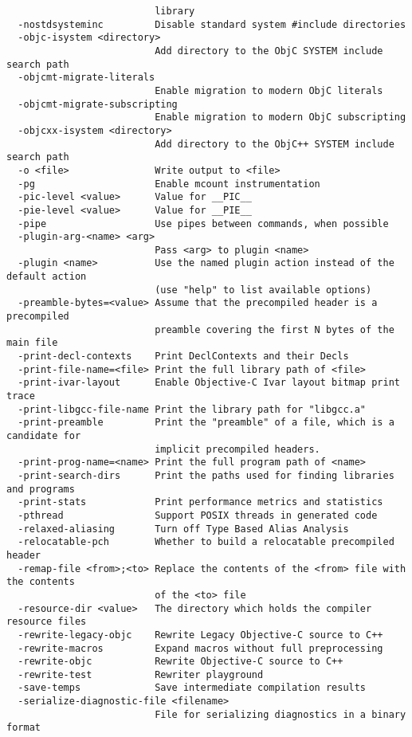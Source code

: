 \begin{verbatim}
                          library
  -nostdsysteminc         Disable standard system #include directories
  -objc-isystem <directory>
                          Add directory to the ObjC SYSTEM include search path
  -objcmt-migrate-literals
                          Enable migration to modern ObjC literals
  -objcmt-migrate-subscripting
                          Enable migration to modern ObjC subscripting
  -objcxx-isystem <directory>
                          Add directory to the ObjC++ SYSTEM include search path
  -o <file>               Write output to <file>
  -pg                     Enable mcount instrumentation
  -pic-level <value>      Value for __PIC__
  -pie-level <value>      Value for __PIE__
  -pipe                   Use pipes between commands, when possible
  -plugin-arg-<name> <arg>
                          Pass <arg> to plugin <name>
  -plugin <name>          Use the named plugin action instead of the default action 
                          (use "help" to list available options)
  -preamble-bytes=<value> Assume that the precompiled header is a precompiled 
                          preamble covering the first N bytes of the main file
  -print-decl-contexts    Print DeclContexts and their Decls
  -print-file-name=<file> Print the full library path of <file>
  -print-ivar-layout      Enable Objective-C Ivar layout bitmap print trace
  -print-libgcc-file-name Print the library path for "libgcc.a"
  -print-preamble         Print the "preamble" of a file, which is a candidate for 
                          implicit precompiled headers.
  -print-prog-name=<name> Print the full program path of <name>
  -print-search-dirs      Print the paths used for finding libraries and programs
  -print-stats            Print performance metrics and statistics
  -pthread                Support POSIX threads in generated code
  -relaxed-aliasing       Turn off Type Based Alias Analysis
  -relocatable-pch        Whether to build a relocatable precompiled header
  -remap-file <from>;<to> Replace the contents of the <from> file with the contents 
                          of the <to> file
  -resource-dir <value>   The directory which holds the compiler resource files
  -rewrite-legacy-objc    Rewrite Legacy Objective-C source to C++
  -rewrite-macros         Expand macros without full preprocessing
  -rewrite-objc           Rewrite Objective-C source to C++
  -rewrite-test           Rewriter playground
  -save-temps             Save intermediate compilation results
  -serialize-diagnostic-file <filename>
                          File for serializing diagnostics in a binary format

\end{verbatim}
